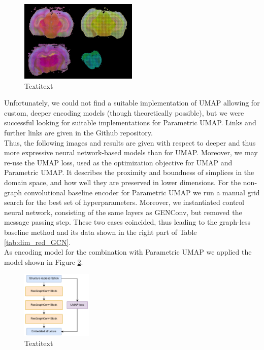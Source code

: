 \documentclass[]{article}
\begin{document}


\begin{figure}
	\centering
	
	\includegraphics[width=0.5\textwidth]{figures/graphiss_anlaysis.jpg}
	
	\caption{Textitext}
	\label{fig:baseline_vis}
\end{figure}



Unfortunately, we could not find a suitable implementation of UMAP allowing for custom, deeper encoding models (though theoretically possible), but we were successful looking for suitable implementations for Parametric UMAP. Links and further links are given in the Github repository. \\

Thus, the following images and results are given with respect to deeper and thus more expressive neural network-based models than for UMAP. Moreover, we may re-use the UMAP loss, used as the optimization objective for UMAP and Parametric UMAP. It describes the proximity and boundness of simplices in the domain space, and how well they are preserved in lower dimensions.
For the non-graph convolutional baseline encoder for Parametric UMAP we run a manual grid search for the best set of hyperparameters. Moreover, we instantiated control neural network, consisting of the same layers as GENConv, but removed the message passing step. These two cases coincided, thus leading to the graph-less baseline method and its data shown in the right part of Table \ref{tab:dim_red_GCN}.\\
As encoding model for the combination with Parametric UMAP we applied the model shown in Figure \ref{fig:dim_red_mdel}.

\begin{figure}
	\centering
	\includegraphics[width=0.3\textwidth]{figures/Dim_red_model_GCN.png}
	\caption{Textitext}
	\label{fig:dim_red_mdel}
\end{figure}
\end{document}
